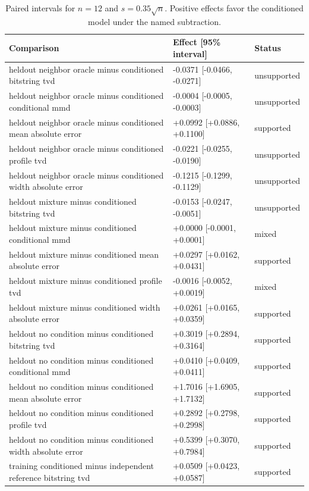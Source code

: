 \begin{table}[p]
\centering
\scriptsize
\setlength{\tabcolsep}{4pt}
\caption{Paired intervals for $n=12$ and $s=0.35\sqrt n$. Positive effects favor the conditioned model under the named subtraction.}
\label{tab:all-intervals-n12-w0.35}
\begin{tabular}{@{}p{}p{}p{}@{}}
\toprule
Comparison & Effect [95\% interval] & Status\\
\midrule
heldout neighbor oracle minus conditioned bitstring tvd & -0.0371 [-0.0466, -0.0271] & unsupported \\
heldout neighbor oracle minus conditioned conditional mmd & -0.0004 [-0.0005, -0.0003] & unsupported \\
heldout neighbor oracle minus conditioned mean absolute error & +0.0992 [+0.0886, +0.1100] & supported \\
heldout neighbor oracle minus conditioned profile tvd & -0.0221 [-0.0255, -0.0190] & unsupported \\
heldout neighbor oracle minus conditioned width absolute error & -0.1215 [-0.1299, -0.1129] & unsupported \\
heldout mixture minus conditioned bitstring tvd & -0.0153 [-0.0247, -0.0051] & unsupported \\
heldout mixture minus conditioned conditional mmd & +0.0000 [-0.0001, +0.0001] & mixed \\
heldout mixture minus conditioned mean absolute error & +0.0297 [+0.0162, +0.0431] & supported \\
heldout mixture minus conditioned profile tvd & -0.0016 [-0.0052, +0.0019] & mixed \\
heldout mixture minus conditioned width absolute error & +0.0261 [+0.0165, +0.0359] & supported \\
heldout no condition minus conditioned bitstring tvd & +0.3019 [+0.2894, +0.3164] & supported \\
heldout no condition minus conditioned conditional mmd & +0.0410 [+0.0409, +0.0411] & supported \\
heldout no condition minus conditioned mean absolute error & +1.7016 [+1.6905, +1.7132] & supported \\
heldout no condition minus conditioned profile tvd & +0.2892 [+0.2798, +0.2998] & supported \\
heldout no condition minus conditioned width absolute error & +0.5399 [+0.3070, +0.7984] & supported \\
training conditioned minus independent reference bitstring tvd & +0.0509 [+0.0423, +0.0587] & supported \\

\end{tabular}
\end{table}
